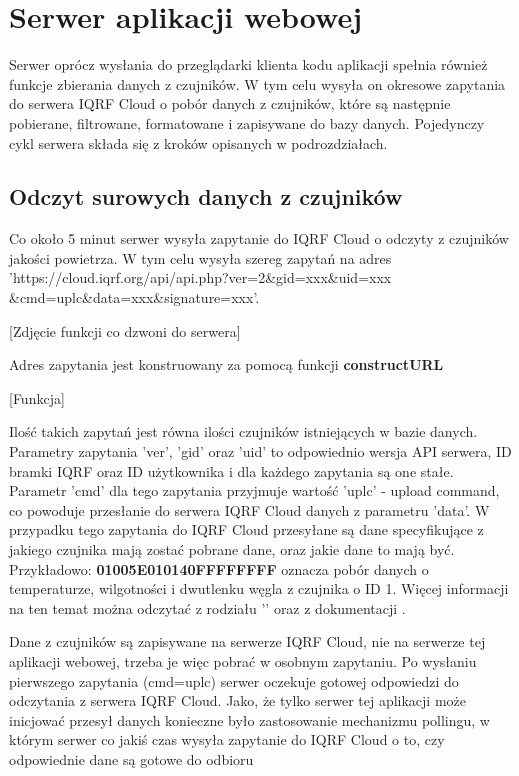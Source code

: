 \section{Serwer aplikacji webowej}

Serwer oprócz wysłania do przeglądarki klienta kodu aplikacji spełnia również funkcje zbierania danych z czujników. W tym celu wysyła on okresowe zapytania
do serwera IQRF Cloud o pobór danych z czujników, które są następnie pobierane, filtrowane, formatowane i zapisywane do bazy danych. Pojedynczy cykl serwera składa
się z kroków opisanych w podrozdziałach.

\subsection{Odczyt surowych danych z czujników}
Co około 5 minut serwer wysyła zapytanie do IQRF Cloud o odczyty z czujników jakości powietrza. W tym celu wysyła szereg zapytań na adres \\
'https://cloud.iqrf.org/api/api.php?ver=2\&gid=xxx\&uid=xxx\\\&cmd=uplc\&data=xxx\&signature=xxx'.

[Zdjęcie funkcji co dzwoni do serwera]

Adres zapytania jest konstruowany za pomocą funkcji \textbf{constructURL}

[Funkcja]

Ilość takich zapytań jest równa ilości czujników istniejących
w bazie danych. Parametry zapytania 'ver', 'gid' oraz 'uid' to odpowiednio wersja API serwera, ID bramki IQRF oraz ID użytkownika i dla każdego zapytania są one 
stałe. Parametr 'cmd' dla tego zapytania przyjmuje wartość 'uplc' - upload command, co powoduje przesłanie do serwera IQRF Cloud danych z parametru 'data'.
W przypadku tego zapytania do IQRF Cloud przesyłane są dane specyfikujące z jakiego czujnika mają zostać pobrane dane, oraz jakie dane to mają być. 
Przykładowo: \textbf{01005E010140FFFFFFFF} oznacza pobór danych o temperaturze, wilgotności i dwutlenku węgla z czujnika o ID 1. Więcej informacji na ten temat 
można odczytać z rodziału '' oraz z dokumentacji \cite{protronix-comms}.

Dane z czujników są zapisywane na serwerze IQRF Cloud, nie na serwerze tej aplikacji webowej, trzeba je więc pobrać w osobnym zapytaniu. 
Po wysłaniu pierwszego zapytania (cmd=uplc) serwer oczekuje gotowej odpowiedzi do odczytania z serwera IQRF Cloud. Jako, że tylko serwer tej aplikacji może inicjować przesył danych
konieczne było zastosowanie mechanizmu pollingu, w którym serwer co jakiś czas wysyła zapytanie do IQRF Cloud o to, czy odpowiednie dane są gotowe do odbioru

